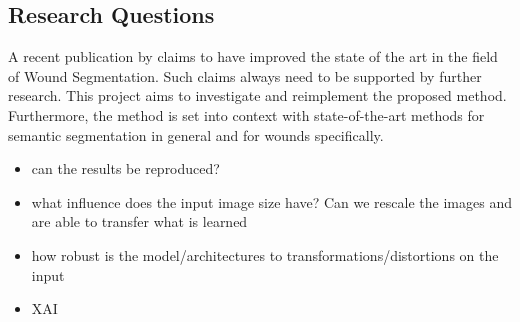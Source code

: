 %


\subsection{Research Questions}

A recent publication by \citeauthor{Oota_2023_WACV} claims to have improved the state of the art in the field of Wound Segmentation. Such claims always need to be supported by further research. This project aims to investigate and reimplement the proposed method. Furthermore, the method is set into context with state-of-the-art methods for semantic segmentation in general and for wounds specifically. 
\begin{itemize}
	\item can the results be reproduced?
	\item what influence does the input image size have? Can we rescale the images and are able to transfer what is learned
	\item how robust is the model/architectures to transformations/distortions on the input
	\item XAI
\end{itemize}